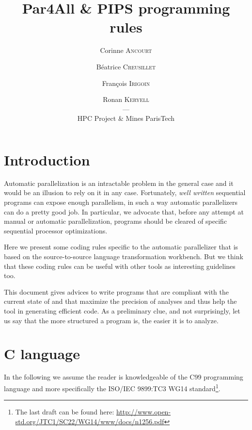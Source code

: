 \documentclass[a4paper]{article}
\begin{document}
\title{Par4All \& PIPS programming rules}

\author{Corinne \textsc{Ancourt} \and Béatrice \textsc{Creusillet} \and
  François \textsc{Irigoin} \and Ronan \textsc{Keryell}\\
  ---\\
  HPC Project \& Mines ParisTech}

\maketitle

\tableofcontents{}



\section{Introduction}
\label{sec:introduction}

Automatic parallelization is an intractable problem in the general
case and it would be an illusion to rely on it in any
case. Fortunately, \emph{well written} sequential programs can expose
enough parallelism, in such a way automatic parallelizers can do a
pretty good job. In particular, we advocate that, before any attempt
at manual or automatic parallelization, programs should be cleared of
specific sequential processor optimizations.

Here we present some coding rules specific to the \Apfa automatic
parallelizer that is based on the \Apips source-to-source language
transformation workbench. But we think that these coding rules can be
useful with other tools as interesting guidelines too.

This document gives advices to write programs that are compliant with the
current state of \Apips and that maximize the precision of analyses and
thus help the tool in generating efficient code. As a preliminary clue,
and not surprisingly, let us say that the more structured a program is,
the easier it is to analyze.


\section{C language}
\label{sec:c-language}

In the following we assume the reader is knowledgeable of the C99
programming language and more specifically the ISO/IEC 9899:TC3 WG14
standard\footnote{The last draft can be found here:
  \url{http://www.open-std.org/JTC1/SC22/WG14/www/docs/n1256.pdf}}.
\end{document}
